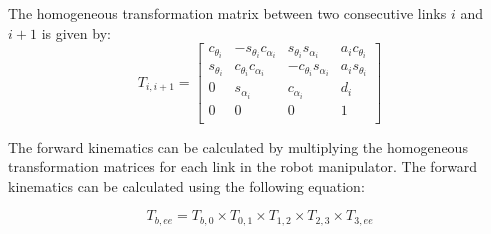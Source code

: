 \documentclass{article}
\begin{document}
The homogeneous transformation matrix between two consecutive links $i$ and $i+1$ is given by:
\begin{equation}
    T_{i,i+1} =
    \begin{bmatrix}
        c_{\theta_i} & -s_{\theta_i}c_{\alpha_i} & s_{\theta_i}s_{\alpha_i}  & a_i c_{\theta_i} \\
        s_{\theta_i} & c_{\theta_i}c_{\alpha_i}  & -c_{\theta_i}s_{\alpha_i} & a_i s_{\theta_i} \\
        0            & s_{\alpha_i}              & c_{\alpha_i}              & d_i              \\
        0            & 0                         & 0                         & 1                \\
    \end{bmatrix}
\end{equation}

The forward kinematics can be calculated by multiplying the homogeneous transformation matrices for each link in the robot manipulator.
The forward kinematics can be calculated using the following equation:

\begin{equation}
    T_{b,ee} = T_{b,0} \times T_{0,1} \times T_{1,2} \times T_{2,3} \times T_{3,ee}
\end{equation}
\end{document}
